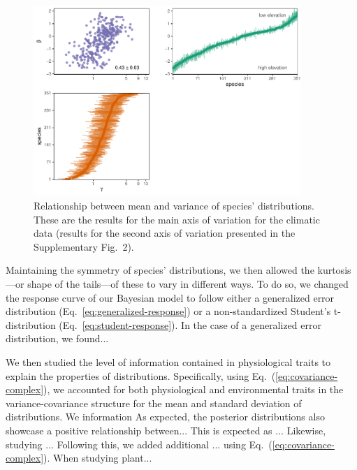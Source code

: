 \documentclass[11pt, a4paper]{article}
\begin{document}
\begin{figure}[ht]
  \centering
    \vspace{0.5cm}
    \includegraphics[width=0.9\textwidth]{figures/figure1}
    	  \vspace{0.3cm}
	   \caption{Relationship between mean and variance of species' distributions. These are the results for the main axis of variation for the climatic data (results for the second axis of variation presented in the Supplementary Fig.~2).}
      \label{fig:correlation}
\end{figure}

Maintaining the symmetry of species' distributions, we then allowed the kurtosis---or shape of the tails---of these to vary in different ways. To do so, we changed the response curve of our Bayesian model to follow either a generalized error distribution (Eq.~\ref{eq:generalized-response}) or a non-standardized Student's t-distribution (Eq.~\ref{eq:student-response}). In the case of a generalized error distribution, we found...


We then studied the level of information contained in physiological traits to explain the properties of distributions. Specifically, using Eq.~(\ref{eq:covariance-complex}), we accounted for both physiological and environmental traits in the variance-covariance structure for the mean and standard deviation of distributions. We information 
As expected, the posterior distributions also showcase a positive relationship between... This is expected as ... Likewise, studying ... Following this, we added additional ... using Eq.~(\ref{eq:covariance-complex}). When studying plant... 
\end{document}

